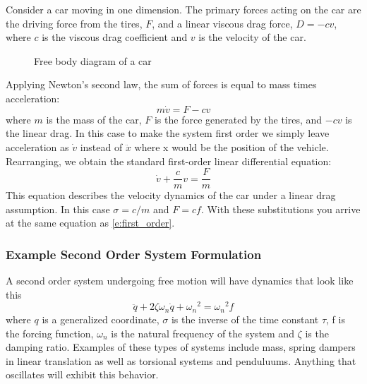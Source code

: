 Consider a car moving in one dimension. The primary forces acting on the car are the driving force from the tires, $F$, and a linear viscous drag force, $D = -cv$, where $c$ is the viscous drag coefficient and $v$ is the velocity of the car.
\begin{figure}[H]
    \centering
    \caption{Free body diagram of a car}
    \label{f:car_fbd}
\end{figure}
\noindent Applying Newton's second law, the sum of forces is equal to mass times acceleration:
\begin{equation}
  m\dot{v} = F - cv
\end{equation}
where $m$ is the mass of the car, $F$ is the force generated by the tires, and $-cv$ is the linear drag. In this case to make the system first order we simply leave acceleration as $\dot{v}$ instead of $\ddot{x}$ where x would be the position of the vehicle. Rearranging, we obtain the standard first-order linear differential equation:
\begin{equation}
  \dot{v} + \frac{c}{m}v = \frac{F}{m}
\end{equation}
This equation describes the velocity dynamics of the car under a linear drag assumption. In this case $\sigma = c/m$ and $F = cf$. With these substitutions you arrive at the same equation as \ref{e:first_order}.

\subsubsection{Example Second Order System Formulation}

A second order system undergoing free motion will have dynamics that look like this
\begin{equation}\label{e:second_order}
\ddot{q} + 2\zeta \omega_n \dot{q} + {\omega_n}^2 = {\omega_n}^2 f
\end{equation}
where $q$ is a generalized coordinate, $\sigma$ is the inverse of the time constant $\tau$, f is the forcing function, $\omega_n$ is the natural frequency of the system and $\zeta$ is the damping ratio. Examples of these types of systems include mass, spring dampers in linear translation as well as torsional systems and penduluums. Anything that oscillates will exhibit this behavior. 

